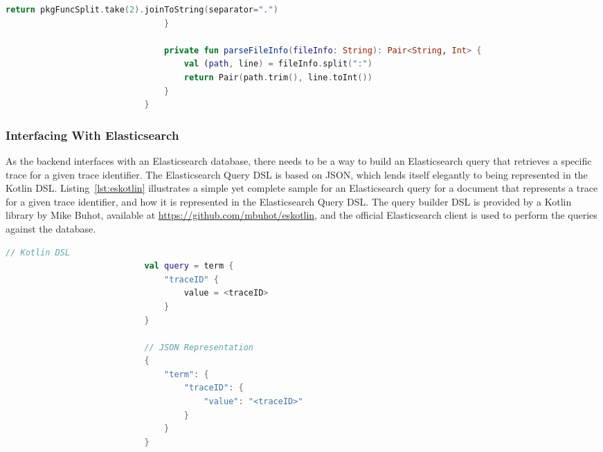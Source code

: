 \documentclass[12pt,pdftex,titlepage]{report}
\begin{document}
\begin{spacing}{1.0}
\begin{lstlisting}[language=Kotlin, gobble=28, label={lst:goparser}]
                                    return pkgFuncSplit.take(2).joinToString(separator=".")
                                }
                            
                                private fun parseFileInfo(fileInfo: String): Pair<String, Int> {
                                    val (path, line) = fileInfo.split(":")
                                    return Pair(path.trim(), line.toInt())
                                }
                            }
                        \end{lstlisting}
                    \end{spacing}
                
                \subsubsection{Interfacing With Elasticsearch}
                    As the backend interfaces with an Elasticsearch database, there needs to be a way to build an Elasticsearch query that retrieves a specific trace for a given trace identifier. The Elasticsearch Query DSL
                    is based on JSON, which lends itself elegantly to being represented in the Kotlin DSL. Listing~\ref{lst:eskotlin} illustrates a simple yet complete sample for an Elasticsearch query for a document that
                    represents a trace for a given trace identifier, and how it is represented in the Elasticsearch Query DSL. The query builder DSL is provided by a Kotlin library by Mike Buhot, available at 
                    \url{https://github.com/mbuhot/eskotlin}, and the official Elasticsearch client is used to perform the queries against the database.

                    \bigskip
                    \begin{spacing}{1.0}
                        \begin{lstlisting}[caption={Comparison between Elasticsearch query using Kotlin DSL and the query in its JSON representation, where $\langle$traceID$\rangle$ refers
                            to a variable storing the trace identifier.}, label={lst:eskotlin}, language=Kotlin, gobble=24]
                            // Kotlin DSL
                            val query = term { 
                                "traceID" {
                                    value = <traceID>
                                }
                            }

                            // JSON Representation
                            {
                                "term": {
                                    "traceID": { 
                                        "value": "<traceID>" 
                                    }
                                }
                            }
                        \end{lstlisting}
                    \end{spacing}
\end{document}
